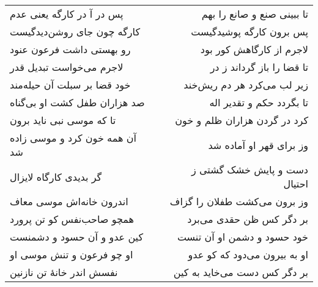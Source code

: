 \begin{center}
\begin{longtable}{l p{0.5cm} r}
\\
پس در آ در کارگه یعنی عدم
&&
تا ببینی صنع و صانع را بهم
\\
کارگه چون جای روشن‌دیدگیست
&&
پس برون کارگه پوشیدگیست
\\
رو بهستی داشت فرعون عنود
&&
لاجرم از کارگاهش کور بود
\\
لاجرم می‌خواست تبدیل قدر
&&
تا قضا را باز گرداند ز در
\\
خود قضا بر سبلت آن حیله‌مند
&&
زیر لب می‌کرد هر دم ریش‌خند
\\
صد هزاران طفل کشت او بی‌گناه
&&
تا بگردد حکم و تقدیر اله
\\
تا که موسی نبی ناید برون
&&
کرد در گردن هزاران ظلم و خون
\\
آن همه خون کرد و موسی زاده شد
&&
وز برای قهر او آماده شد
\\
گر بدیدی کارگاه لایزال
&&
دست و پایش خشک گشتی ز احتیال
\\
اندرون خانه‌اش موسی معاف
&&
وز برون می‌کشت طفلان را گزاف
\\
همچو صاحب‌نفس کو تن پرورد
&&
بر دگر کس ظن حقدی می‌برد
\\
کین عدو و آن حسود و دشمنست
&&
خود حسود و دشمن او آن تنست
\\
او چو فرعون و تنش موسی او
&&
او به بیرون می‌دود که کو عدو
\\
نفسش اندر خانهٔ تن نازنین
&&
بر دگر کس دست می‌خاید به کین
\\
\end{longtable}
\end{center}
